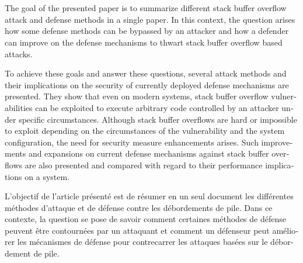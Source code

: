 \newenvironment{abstractpage}
  {\cleardoublepage\thispagestyle{empty}\chapter*{\abstractname}}
  {\cleardoublepage}
\renewenvironment{abstract}[1]
  {\bigskip\begin{otherlanguage}{#1}%
   \begin{center}\bfseries\abstractname\end{center}\noindent}
  {\end{otherlanguage}\par\bigskip}

\begin{abstractpage}
  \begin{abstract}{american}
    The goal of the presented paper is to summarize different stack buffer overflow attack and defense methods in a single paper.
    In this context, the question arises how some defense methods can be bypassed by an attacker and how a defender can improve on the defense mechanisms to thwart stack buffer overflow based attacks.

    To achieve these goals and answer these questions, several attack methods and their implications on the security of currently deployed defense mechanisms are presented.
    They show that even on modern systems, stack buffer overflow vulnerabilities can be exploited to execute arbitrary code controlled by an attacker under specific circumstances.
    Although stack buffer overflows are hard or impossible to exploit depending on the circumstances of the vulnerability and the system configuration, the need for security measure enhancements arises.
    Such improvements and expansions on current defense mechanisms against stack buffer overflows are also presented and compared with regard to their performance implications on a system.
  \end{abstract}
  \vspace{2em}
  \begin{abstract}{french}
    L'objectif de l'article présenté est de résumer en un seul document les différentes méthodes d'attaque et de défense contre les débordements de pile.
    Dans ce contexte, la question se pose de savoir comment certaines méthodes de défense peuvent être contournées par un attaquant et comment un défenseur peut améliorer les mécanismes de défense pour contrecarrer les attaques basées sur le débordement de pile.


\end{abstract}
\end{abstractpage}
